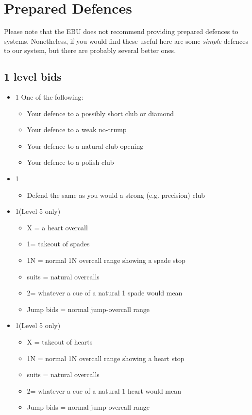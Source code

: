 \section{Prepared Defences}
\label{appx:defences}

Please note that the EBU does not recommend providing prepared defences to
systems.  Nonetheless, if you would find these useful here are some {\em simple}
defences to our system, but there are probably several better ones.

\subsection{1 level bids}

\begin{itemize}
\item 1\clubs
	One of the following:
	\begin{itemize}
	\item Your defence to a possibly short club or diamond
	\item Your defence to a weak no-trump
	\item Your defence to a natural club opening 
	\item Your defence to a polish club
	\end{itemize}
\item 1\diamonds
	\begin{itemize}
	\item Defend the same as you would a strong (e.g. precision) club
	\end{itemize}
\item 1\hearts (Level 5 only)
	\begin{itemize}
	\item X = a heart overcall
	\item 1\spades = takeout of spades
	\item 1N = normal 1N overcall range showing a spade stop
	\item suits = natural overcalls
	\item 2\spades = whatever a cue of a natural 1 spade would mean 
	\item Jump bids = normal jump-overcall range
	\end{itemize}
\item 1\spades (Level 5 only)
	\begin{itemize}
	\item X = takeout of hearts
	\item 1N = normal 1N overcall range showing a heart stop
	\item suits = natural overcalls
	\item 2\hearts = whatever a cue of a natural 1 heart would mean 
	\item Jump bids = normal jump-overcall range
	\end{itemize}


\end{itemize}
